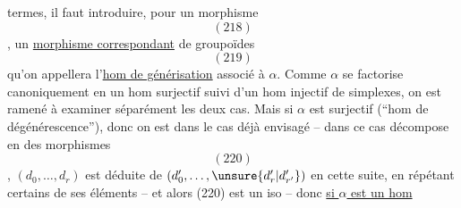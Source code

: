termes, il faut introduire, 
pour un morphisme
\[
(218)
\]
,
un \uline{morphisme correspondant} de groupoïdes
\[
(219)
\]
qu'on appellera l'\uline{hom de générisation}
associé à $\alpha$.
Comme $\alpha$ se factorise
canoniquement en un hom surjectif
suivi d'un hom injectif de simplexes,
on est ramené à examiner séparément
les deux cas. Mais si $\alpha$ est surjectif
(``hom de dégénérescence''), 
donc on est dans le cas déjà envisagé --
 dans ce cas
décompose en des morphismes
\[
(220)
\]
,
$(d_0,\ldots,d_r)$ est déduite de $(d'_0,\ldots,\unsure{d'_r|d'_{r'}})$
en  cette suite, en répétant certains
de ses éléments -- et  alors (220) est
un iso -- donc \uline{si $\alpha$ est un hom}
